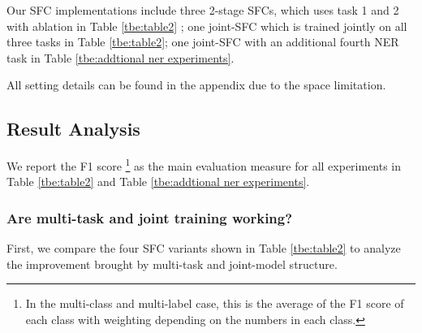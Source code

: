 Our SFC implementations include three 2-stage SFCs, which uses task 1 and 2 with ablation in Table \ref{tbe:table2} ; one joint-SFC which is trained jointly on all three tasks in Table \ref{tbe:table2}; one joint-SFC with an additional fourth NER task in Table \ref{tbe:addtional ner experiments}. 

All setting details can be found in the appendix due to the space limitation.

\subsection{Result Analysis}
We  report  the F1 score \footnote{In the multi-class and multi-label case, this
is  the  average  of  the F1 score of each class with weighting depending on the
numbers  in  each class.} as the main evaluation measure for all experiments in
Table \ref{tbe:table2} and Table \ref{tbe:addtional ner experiments}.

\subsubsection*{Are multi-task and joint training working?} 
First, we compare the four  SFC  variants shown in Table \ref{tbe:table2} to analyze the improvement
brought  by  multi-task  and  joint-model  structure. 

